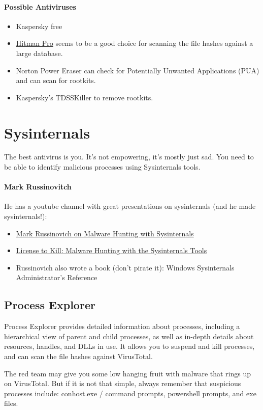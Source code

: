 \documentclass{article}
\begin{document}
\paragraph{Possible Antiviruses}
\begin{itemize}
\item Kaspersky free
\item \href{https://www.sophos.com/en-us/free-tools/hitmanpro}{Hitman Pro}
seems to be a good choice for scanning the file hashes against a large database.
\item Norton Power Eraser can check for Potentially Unwanted Applications (PUA) and can scan for rootkits.
\item Kaspersky's TDSSKiller to remove rootkits.
\end{itemize}

\section{Sysinternals}
The best antivirus is you. It's not empowering, it's mostly just sad.
You need to be able to identify malicious processes using Sysinternals tools.

\paragraph{Mark Russinovitch} He has a youtube channel with great presentations on sysinternals (and he made sysinternals!): 
\begin{itemize}
\item \href{https://youtu.be/vW8eAqZyWeo}{Mark Russinovich on Malware Hunting with Sysinternals}
\item \href{https://youtu.be/A_TPZxuTzBU}{License to Kill: Malware Hunting with the Sysinternals Tools }
\item Russinovich also wrote a book (don't pirate it): Windows Sysinternals Administrator’s Reference
\end{itemize}

\subsection{Process Explorer}
Process Explorer provides detailed information about processes, including a hierarchical view of parent 
and child processes, as well as in-depth details about resources, handles, and DLLs in use.
It allows you to suspend and kill processes, and can scan the file hashes against VirusTotal.

The red team may give you some low hanging fruit with malware that rings up on VirusTotal.
But if it is not that simple, always remember that suspicious processes include:
conhost.exe / command prompts,
powershell prompts,
and exe files.
\end{document}

